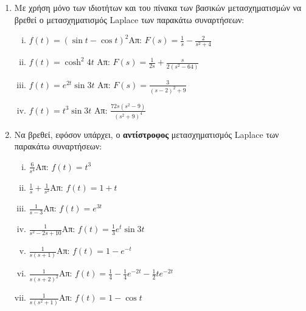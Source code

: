 


\geometry{left=15.63mm,right=15.63mm,top=32.25mm,bottom=36.25mm,footskip=24.16mm,headsep=24.16mm}

\everymath{\displaystyle}
\pagestyle{askhseis}



\begin{center}
  \minibox{\large\bf \textcolor{Col1}{Ασκήσεις στο Μετασχηματισμό Laplace}}
\end{center}

\vspace{\baselineskip}

\begin{enumerate}

  \item Με χρήση μόνο των ιδιοτήτων και του πίνακα των βασικών μετασχηματισμών να βρεθεί 
    ο μετασχηματισμός Laplace των παρακάτω συναρτήσεων:
    \begin{enumerate}[i)]
      \item $f(t)=(\sin t-\cos t)^2$\hfill Απ: $F(s)=\frac{1}{s}-\frac{2}{s^2+4}$
      \item $f(t)=\cosh^2 4t$ \hfill Απ: $F(s)=\frac{1}{2s}+\frac{s}{2(s^2-64)}$
      \item $f(t)=e^{2t}\sin 3t$ \hfill Απ: $F(s)=\frac{3}{(s-2)^2+9}$
      \item $f(t)=t^3\sin 3t$ \hfill Απ: $\frac{72s(s^2-9)}{(s^2+9)^4}$
    \end{enumerate}

  \item Να βρεθεί, εφόσον υπάρχει, ο \textbf{αντίστροφος} μετασχηματισμός Laplace 
    των παρακάτω συναρτήσεων:
    \begin{enumerate}[i)]
      \item $\frac{6}{s^4}$\hfill Απ: $f(t)=t^3$
      \item $\frac{1}{s}+\frac{1}{s^2}$\hfill Απ: $f(t)=1+t$
      \item $\frac{1}{s-3}$\hfill Απ: $f(t)=e^{3t}$
      \item $\frac{1}{s^2-2s+10}$\hfill Απ: $f(t)=\frac{1}{3}e^t\sin 3t$
      \item $\frac{1}{s(s+1)}$\hfill Απ: $f(t)=1-e^{-t}$
      \item $\frac{1}{s(s+2)^2}$\hfill Απ: $f(t)=\frac{1}{4}-\frac{1}{4}e^{-2t}-
        \frac{1}{2}te^{-2t}$
      \item $\frac{1}{s(s^2+1)}$\hfill Απ: $f(t)=1-\cos t$
    \end{enumerate}


\end{enumerate}
